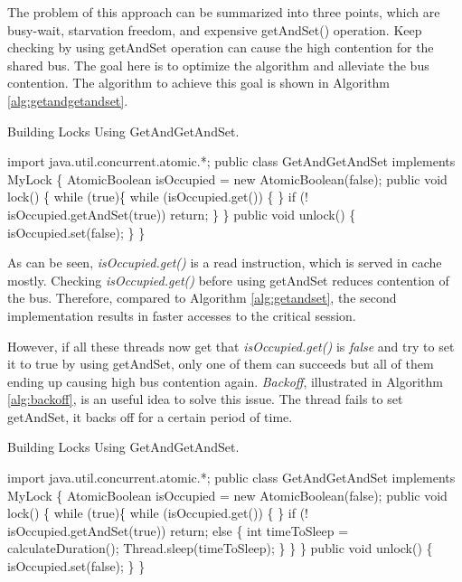 \documentclass[twoside]{article}
\begin{document}
The problem of this approach can be summarized into three points, which are busy-wait, starvation freedom, and expensive getAndSet() operation.
Keep checking by using getAndSet operation can cause the high contention for the shared bus. The goal here is to optimize the algorithm and alleviate the bus contention. The algorithm to achieve this goal is shown in Algorithm \ref{alg:getandgetandset}.

\begin{algorithm}
\caption{Building Locks Using GetAndGetAndSet.}
\begin{algorithmic}[1]
\State import java.util.concurrent.atomic.*;
\State public class GetAndGetAndSet implements MyLock \{
\State \indent AtomicBoolean isOccupied = new AtomicBoolean(false);
\State \indent public void lock() \{
\State \indent \indent while (true)\{
\State \indent \indent \indent while (isOccupied.get()) \{
\State \indent \indent \indent \}
\State \indent \indent \indent if (! isOccupied.getAndSet(true)) return;
\State \indent \indent \} 
\State \indent \}
\State \indent public void unlock() \{
\State \indent \indent isOccupied.set(false);
\State \indent \}
\State \}
\end{algorithmic}
\label{alg:getandgetandset}
\end{algorithm}

As can be seen, \textit{isOccupied.get()} is a read instruction, which is served in cache mostly. Checking \textit{isOccupied.get()} before using getAndSet reduces contention of the bus. Therefore, compared to Algorithm \ref{alg:getandset}, the second implementation results in faster accesses to the critical session.

However, if all these threads now get that \textit{isOccupied.get()} is \textit{false} and try to set it to true by using getAndSet, only one of them can succeeds but all of them ending up causing high bus contention again. \textit{Backoff}, illustrated in Algorithm \ref{alg:backoff}, is an useful idea to solve this issue. The thread fails to set getAndSet, it backs off for a certain period of time. 

\begin{algorithm}
\caption{Building Locks Using GetAndGetAndSet.}
\begin{algorithmic}[1]
\State import java.util.concurrent.atomic.*;
\State public class GetAndGetAndSet implements MyLock \{
\State \indent AtomicBoolean isOccupied = new AtomicBoolean(false);
\State \indent public void lock() \{
\State \indent \indent while (true)\{
\State \indent \indent \indent while (isOccupied.get()) \{
\State \indent \indent \indent \}
\State \indent \indent \indent if (! isOccupied.getAndSet(true)) return;
\State \indent \indent \indent else \{
\State \indent \indent \indent \indent int timeToSleep = calculateDuration();
\State \indent \indent \indent \indent Thread.sleep(timeToSleep);
\State \indent \indent \indent \}
\State \indent \indent \} 
\State \indent \}
\State \indent public void unlock() \{
\State \indent \indent isOccupied.set(false);
\State \indent \}
\State \}
\end{algorithmic}
\label{alg:backoff}
\end{algorithm}
\end{document}
